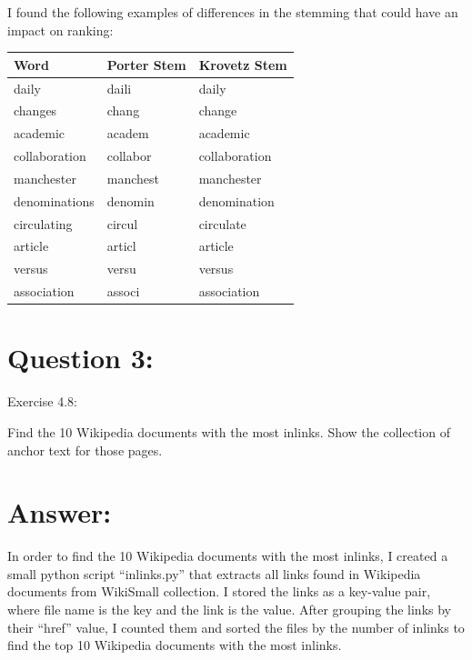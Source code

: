 \documentclass[a4paper, 11pt]{article}
\begin{document}
\pagebreak

I found the following examples of differences in the stemming that could have an impact on ranking:

\begin{longtable}{ |p{3cm}|p{3cm}|p{3cm}| } 
\hline
Word & Porter Stem & Krovetz Stem \\
 \hline 
 daily & daili & daily \\
 \hline
  changes & chang & change \\
 \hline
  academic & academ & academic \\
 \hline
  collaboration & collabor & collaboration \\
 \hline
  manchester & manchest & manchester \\
 \hline
  denominations & denomin & denomination \\
 \hline
  circulating & circul & circulate \\
 \hline
  article & articl & article \\
 \hline
  versus & versu & versus \\
 \hline
  association & associ & association \\
 \hline
\end{longtable}



\section*{Question 3:}
Exercise 4.8:

Find the 10 Wikipedia documents with the most inlinks. Show the collection of anchor text for those pages.

\section*{Answer:}

In order to find the 10 Wikipedia documents with the most inlinks, I created a small python script ``inlinks.py'' that extracts all links found in Wikipedia documents from WikiSmall collection. I stored the links as a key-value pair, where file name is the key and the link is the value. After grouping the links by their ``href'' value, I counted them and sorted the files by the number of inlinks to find the top 10  Wikipedia documents with the most inlinks.


\end{document}
